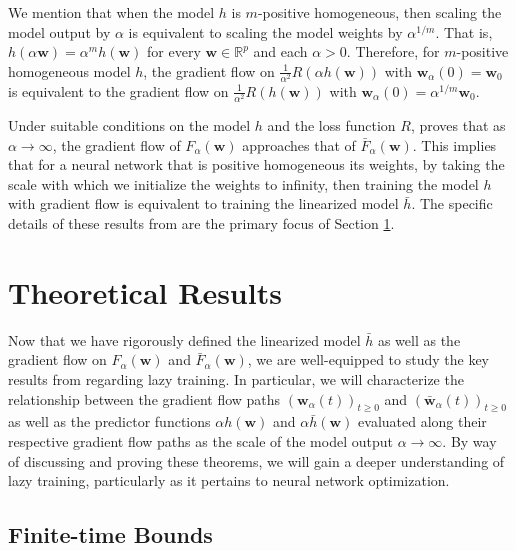 \documentclass{article}
\begin{document}
We mention that when the model $h$ is $m$-positive homogeneous, then scaling the model output by $\alpha$ is equivalent to scaling the model weights by $\alpha^{1/m}$. That is, $h(\alpha \boldsymbol{w}) = \alpha^m h(\boldsymbol{w})$ for every $\boldsymbol{w} \in \mathbb{R}^p$ and each $\alpha > 0$. Therefore, for $m$-positive homogeneous model $h$, the gradient flow on $\frac{1}{\alpha^2}R(\alpha h(\boldsymbol{w}))$ with $\boldsymbol{w}_{\alpha}(0) = \boldsymbol{w}_0$ is equivalent to the gradient flow on $\frac{1}{\alpha^2}R(h(\boldsymbol{w}))$ with $\boldsymbol{w}_{\alpha}(0) = \alpha^{1/m}\boldsymbol{w}_0$.

Under suitable conditions on the model $h$ and the loss function $R$, \cite{chizat2018lazy} proves that as $\alpha \rightarrow \infty$, the gradient flow of $F_{\alpha}(\boldsymbol{w})$ approaches that of $\bar{F}_{\alpha}(\boldsymbol{w})$. This implies that for a neural network that is positive homogeneous its weights, by taking the scale with which we initialize the weights to infinity, then training the model  $h$ with gradient flow is equivalent to training the linearized model $\bar{h}$. The specific details of these results from \cite{chizat2018lazy} are the primary focus of Section \ref{theory}.

\section{Theoretical Results}\label{theory}

Now that we have rigorously defined the linearized model $\bar{h}$ as well as the gradient flow on $F_{\alpha}(\boldsymbol{w})$ and $\bar{F}_{\alpha}(\boldsymbol{w})$, we are well-equipped to study the key results from \cite{chizat2018lazy} regarding lazy training. In particular, we will characterize the relationship between the gradient flow paths $(\boldsymbol{w}_{\alpha}(t))_{t \geq 0}$ and $(\boldsymbol{\bar{w}}_{\alpha}(t))_{t \geq 0}$ as well as the predictor functions $\alpha h(\boldsymbol{w})$ and $\alpha \bar{h}(\boldsymbol{w})$ evaluated along their respective gradient flow paths as the scale of the model output $\alpha \rightarrow \infty$. By way of discussing and proving these theorems, we will gain a deeper understanding of lazy training, particularly as it pertains to neural network optimization.

\subsection{Finite-time Bounds}\label{finitebounds}
\end{document}
